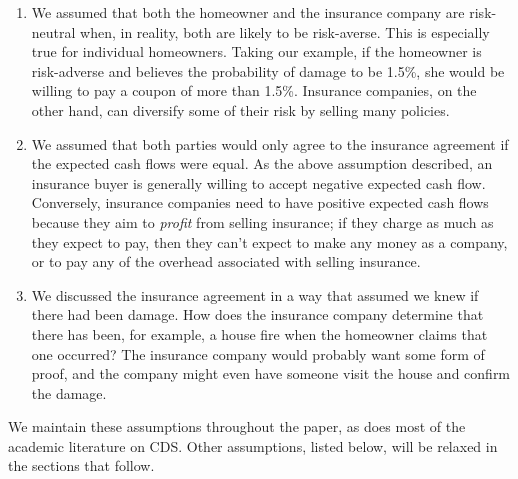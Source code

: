 \documentclass{jss}
\begin{document}
\begin{enumerate}

\item We assumed that both the homeowner and the insurance company are risk-neutral when, in reality, both are likely to be risk-averse. This is especially true for individual homeowners. Taking our example, if the homeowner is risk-adverse and believes the probability of damage to be 1.5\%, she would be willing to pay a coupon of more than 1.5\%. Insurance companies, on the other hand, can diversify some of their risk by selling many policies.

\item We assumed that both parties would only agree to the insurance agreement if the expected cash flows were equal. As the above assumption described, an insurance buyer is generally willing to accept negative expected cash flow. Conversely, insurance companies need to have positive expected cash flows because they aim to \emph{profit} from selling insurance; if they charge as much as they expect to pay, then they can't expect to make any money as a company, or to pay any of the overhead associated with selling insurance. 

\item We discussed the insurance agreement in a way that assumed we knew if there had been damage. How does the insurance company determine that there has been, for example, a house fire when the homeowner claims that one occurred? The insurance company would probably want some form of proof, and the company might even have someone visit the house and confirm the damage.

\end{enumerate}


We maintain these assumptions throughout the paper, as does most of the academic literature on CDS. Other assumptions, listed below, will be relaxed in the sections that follow.

\end{document}
